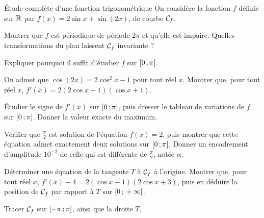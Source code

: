 \begin{exercice}[3]{Étude complète d'une fonction trigonométrique}
On considère la fonction $f$ définie sur $\mathbb{R}$ par $f(x)=2\sin x+\sin(2x)$, de courbe $\mathcal{C}_f$.
\begin{questions}
  \item Montrer que $f$ est périodique de période $2\pi$ et qu'elle est impaire. Quelles transformations du plan laissent
    $\mathcal{C}_f$ invariante ?
  \item Expliquer pourquoi il suffit d'étudier $f$ sur $\mathopen{[}0\,{;}\,\pi\mathclose{]}$.
\end{questions}
\begin{questions}[resume]
  \item On admet que $\cos(2x)=2\cos^{2}x-1$ pour tout réel $x$. Montrer que, pour tout réel $x$,
    $f'(x)=2(2\cos x-1)(\cos x+1)$.
  \item Étudier le signe de $f'(x)$ sur $\mathopen{[}0\,{;}\,\pi\mathclose{]}$, puis dresser le tableau de variations de $f$ sur $\mathopen{[}0\,{;}\,\pi\mathclose{]}$.
    Donner la valeur exacte du maximum.
\end{questions}
\begin{questions}[resume]
  \item Vérifier que $\frac{\pi}{2}$ est solution de l'équation $f(x)=2$, puis montrer que cette équation admet exactement deux
    solutions sur $\mathopen{[}0\,{;}\,\pi\mathclose{]}$. Donner un encadrement d'amplitude $10^{-2}$ de celle qui est différente de $\frac{\pi}{2}$, notée $\alpha$.
  \item Déterminer une équation de la tangente $T$ à $\mathcal{C}_f$ à l'origine. Montrer que, pour tout réel $x$,
    $f'(x)-4=2\left(\cos x-1\right)\left(2\cos x+3\right)$, puis en déduire la position de $\mathcal{C}_f$ par rapport à $T$ sur $\mathopen{[}0\,{;}\,+\infty\mathclose{[}$.
  \item Tracer $\mathcal{C}_f$ sur $\mathopen{[}-\pi\,{;}\,\pi\mathclose{]}$, ainsi que la droite $T$.
\end{questions}
\end{exercice}

